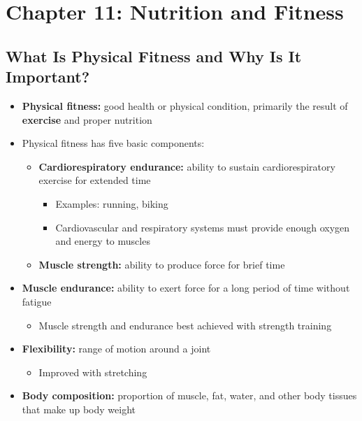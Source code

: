 \documentclass[12pt]{article}
\begin{document}
    \section{Chapter 11: Nutrition and Fitness}

        \subsection{What Is Physical Fitness and Why Is It Important?}
            \begin{itemize}
                \item \textbf{Physical fitness:} good health or physical condition, primarily the result of \textbf{exercise} and proper nutrition
                \item Physical fitness has five basic components:
                    \begin{itemize}
                        \item \textbf{Cardiorespiratory endurance:} ability to sustain cardiorespiratory exercise for extended time
                            \begin{itemize}
                                \item Examples: running, biking
                                \item Cardiovascular and respiratory systems must provide enough oxygen and energy to muscles
                            \end{itemize}
                        \item \textbf{Muscle strength:} ability to produce force for brief time
                    \end{itemize}
                \item \textbf{Muscle endurance:} ability to exert force for a long period of time without fatigue
                    \begin{itemize}
                        \item Muscle strength and endurance best achieved with strength training
                    \end{itemize}
                \item \textbf{Flexibility:} range of motion around a joint
                    \begin{itemize}
                        \item Improved with stretching
                    \end{itemize}
                \item \textbf{Body composition:} proportion of muscle, fat, water, and other body tissues that make up body weight

\end{itemize}
\end{document}
